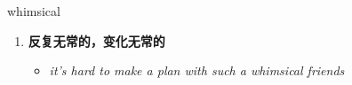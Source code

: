 
\begin{frame}
{\huge whimsical}
\begin{center}
\begin{enumerate}\Large
  \item \textbf{反复无常的，变化无常的}
  \begin{itemize}
    \item \em{\Large{it's hard to make a plan with such a whimsical friends}}
  \end{itemize}
\end{enumerate}
\end{center}
\end{frame}
